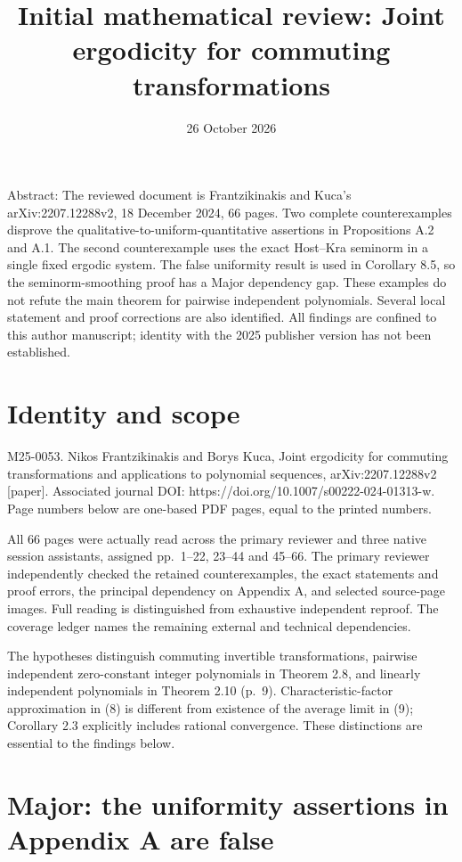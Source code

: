 \documentclass[10pt]{article}
\title{Initial mathematical review:
Joint ergodicity for commuting transformations}
\author{}
\date{26 October 2026}
\begin{document}
\maketitle
Abstract: The reviewed document is Frantzikinakis and Kuca’s arXiv:2207.12288v2, 18 December 2024, 66 pages. Two complete counterexamples disprove the qualitative-to-uniform-quantitative assertions in Propositions A.2 and A.1. The second counterexample uses the exact Host–Kra seminorm in a single fixed ergodic system. The false uniformity result is used in Corollary 8.5, so the seminorm-smoothing proof has a Major dependency gap. These examples do not refute the main theorem for pairwise independent polynomials. Several local statement and proof corrections are also identified. All findings are confined to this author manuscript; identity with the 2025 publisher version has not been established.\par
\section*{Identity and scope}
M25-0053. Nikos Frantzikinakis and Borys Kuca, Joint ergodicity for commuting transformations and applications to polynomial sequences, arXiv:2207.12288v2 [paper]. Associated journal DOI: https://doi.org/10.1007/s00222-024-01313-w. Page numbers below are one-based PDF pages, equal to the printed numbers.\par
All 66 pages were actually read across the primary reviewer and three native session assistants, assigned pp. 1–22, 23–44 and 45–66. The primary reviewer independently checked the retained counterexamples, the exact statements and proof errors, the principal dependency on Appendix A, and selected source-page images. Full reading is distinguished from exhaustive independent reproof. The coverage ledger names the remaining external and technical dependencies.\par
The hypotheses distinguish commuting invertible transformations, pairwise independent zero-constant integer polynomials in Theorem 2.8, and linearly independent polynomials in Theorem 2.10 (p. 9). Characteristic-factor approximation in (8) is different from existence of the average limit in (9); Corollary 2.3 explicitly includes rational convergence. These distinctions are essential to the findings below.\par
\section*{Major: the uniformity assertions in Appendix A are false}
\end{document}
